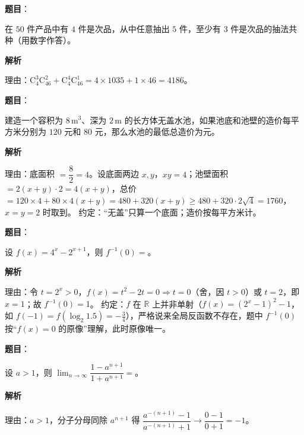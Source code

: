 \begin{answer}

\textbf{题目}：

在 $50$ 件产品中有 $4$ 件是次品，从中任意抽出 $5$ 件，至少有 $3$ 件是次品的抽法共\underline{\qquad\qquad}种（用数字作答）。

\textbf{解析}

理由：$\mathrm C_4^3\mathrm C_{46}^2+\mathrm C_4^4\mathrm C_{46}^1=4\times1035+1\times46=4186$。


\end{answer}
\begin{answer}

\textbf{题目}：

建造一个容积为 $8\,\mathrm m^3$、深为 $2\,\mathrm m$ 的长方体无盖水池，如果池底和池壁的造价每平方米分别为 $120$ 元和 $80$ 元，那么水池的最低总造价为\underline{\qquad\qquad}元。

\textbf{解析}

理由：底面积 $=\dfrac82=4$。设底面两边 $x,y$，$xy=4$；池壁面积 $=2(x+y)\cdot2=4(x+y)$，总价 $=120\times4+80\times4(x+y)=480+320(x+y)\ge480+320\cdot2\sqrt4=1760$，$x=y=2$ 时取到。
约定：“无盖”只算一个底面；造价按每平方米计。


\end{answer}
\begin{answer}

\textbf{题目}：

设 $f(x)=4^x-2^{x+1}$，则 $f^{-1}(0)=$\underline{\qquad\qquad}。

\textbf{解析}

理由：令 $t=2^x>0$，$f(x)=t^2-2t=0\Rightarrow t=0$（舍，因 $t>0$）或 $t=2$，即 $x=1$；故 $f^{-1}(0)=1$。
约定：$f$ 在 $\mathbb R$ 上并非单射（$f(x)=(2^x-1)^2-1$，如 $f(-1)=f(\log_2 1.5)=-\frac34$），严格说来全局反函数不存在，题中 $f^{-1}(0)$ 按“$f(x)=0$ 的原像”理解，此时原像唯一。


\end{answer}
\begin{answer}

\textbf{题目}：

设 $a>1$，则 $\displaystyle\lim_{n\to\infty}\dfrac{1-a^{n+1}}{1+a^{n+1}}=$\underline{\qquad\qquad}。

\textbf{解析}

理由：$a>1$，分子分母同除 $a^{n+1}$ 得 $\dfrac{a^{-(n+1)}-1}{a^{-(n+1)}+1}\to\dfrac{0-1}{0+1}=-1$。


\end{answer}

